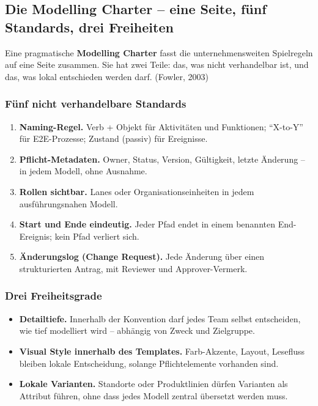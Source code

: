 \documentclass[11pt,a4paper,oneside]{article}
\newcommand{\fachbegriff}[1]{\textbf{#1}}
\newcommand{\quelle}[1]{{\footnotesize\color{lpGray}(#1)}}
\begin{document}
\subsection{Die Modelling Charter -- eine Seite, fünf Standards, drei Freiheiten}

Eine pragmatische \fachbegriff{Modelling Charter} fasst die unternehmensweiten Spielregeln auf eine Seite zusammen. Sie hat zwei Teile: das, was nicht verhandelbar ist, und das, was lokal entschieden werden darf. \quelle{Fowler, 2003}

\subsubsection{Fünf nicht verhandelbare Standards}

\begin{enumerate}
  \item \textbf{Naming-Regel.} Verb + Objekt für Aktivitäten und Funktionen; ``X-to-Y'' für E2E-Prozesse; Zustand (passiv) für Ereignisse.
  \item \textbf{Pflicht-Metadaten.} Owner, Status, Version, Gültigkeit, letzte Änderung -- in jedem Modell, ohne Ausnahme.
  \item \textbf{Rollen sichtbar.} Lanes oder Organisationseinheiten in jedem ausführungsnahen Modell.
  \item \textbf{Start und Ende eindeutig.} Jeder Pfad endet in einem benannten End-Ereignis; kein Pfad verliert sich.
  \item \textbf{Änderungslog (Change Request).} Jede Änderung über einen strukturierten Antrag, mit Reviewer und Approver-Vermerk.
\end{enumerate}

\subsubsection{Drei Freiheitsgrade}

\begin{itemize}
  \item \textbf{Detailtiefe.} Innerhalb der Konvention darf jedes Team selbst entscheiden, wie tief modelliert wird -- abhängig von Zweck und Zielgruppe.
  \item \textbf{Visual Style innerhalb des Templates.} Farb-Akzente, Layout, Lesefluss bleiben lokale Entscheidung, solange Pflichtelemente vorhanden sind.
  \item \textbf{Lokale Varianten.} Standorte oder Produktlinien dürfen Varianten als Attribut führen, ohne dass jedes Modell zentral übersetzt werden muss.
\end{itemize}
\end{document}
